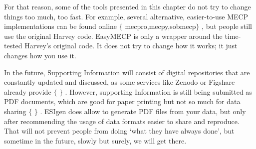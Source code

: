 For that reason, some of the tools presented in this chapter do not try to change things too much, too fast. For example, several alternative, easier-to-use MECP implementations can be found online $ \{ $ mecpro,mecpy,sobmecp$ \} $ , but people still use the original Harvey code. EasyMECP is only a wrapper around the time-tested Harvey’s original code. It does not try to change how it works; it just changes how you use it.

In the future, Supporting Information will consist of digital repositories that are constantly updated and discussed, as some services like Zenodo or Figshare already provide $ \{ $ $ \} $ . However, supporting Information is still being submitted as PDF documents, which are good for paper printing but not so much for data sharing $ \{ $ $ \} $ . ESIgen does allow to generate PDF files from your data, but only after recommending the usage of data formats easier to share and reproduce. That will not prevent people from doing ‘what they have always done’, but sometime in the future, slowly but surely, we will get there.
